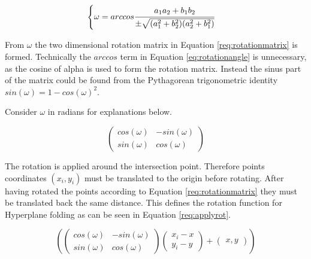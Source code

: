 \documentclass[a4paper,twoside]{bth}
\begin{document}
\begin{equation}\label{eq:rotationangle}
\begin{aligned}
   \begin{cases}
    \omega = arccos \cfrac{a_1 a_2 + b_1 b_2}{\pm \sqrt{(a_1^2 +  b_2^2) (a_2^2 + b_1^2)}}
    \end{cases}
\end{aligned}
\end{equation} 

From $\omega$ the two dimensional rotation matrix in Equation \ref{req:rotationmatrix} is formed. Technically the $arccos$ term in Equation \ref{eq:rotationangle} is unnecessary, as the cosine of alpha is used to form the rotation matrix. Instead the sinus part of the matrix could be found from the Pythagorean trigonometric identity $sin(\omega) = 1 - cos(\omega)^2$. 
\par Consider $\omega$ in radians for explanations below.


\begin{equation}\label{req:rotationmatrix}
{
\left({\begin{array}{ccc} cos(\omega) & -sin(\omega) \\ sin(\omega) & cos(\omega) \end{array}}\right) 
}
\end{equation}

\par The rotation is applied around the intersection point. Therefore points coordinates $(x_i, y_i)$ must be translated to the origin before rotating. After having rotated the points according to Equation \ref{req:rotationmatrix} they must be translated back the same distance. This defines the rotation function for Hyperplane folding as can be seen in Equation \ref{req:applyrot}. 


\begin{equation}\label{req:applyrot}
{
\left({\left({\begin{array}{ccc} cos(\omega) & -sin(\omega) \\ sin(\omega) & cos(\omega) \end{array}}\right) 
\left({\begin{array}{c} x_i - x \\ y_i - y \end{array}}\right) +
\left({\begin{array}{c} x,  y \end{array}}\right) 
}\right)}
\end{equation}
\end{document}
